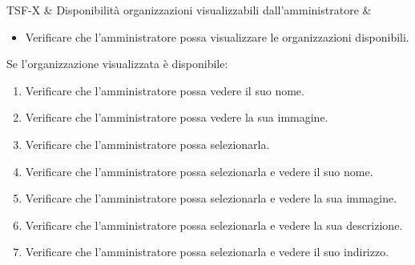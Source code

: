 TSF-X & Disponibilità organizzazioni visualizzabili dall'amministratore & \begin{itemize}
    \item Verificare che l'amministratore possa visualizzare le organizzazioni disponibili.
\end{itemize}
Se l'organizzazione visualizzata è disponibile:
\begin{enumerate}
    \item Verificare che l'amministratore possa vedere il suo nome.
    \item Verificare che l'amministratore possa vedere la sua immagine.
    \item Verificare che l'amministratore possa selezionarla.
    \item Verificare che l'amministratore possa selezionarla e vedere il suo nome.
    \item Verificare che l'amministratore possa selezionarla e vedere la sua immagine.
    \item Verificare che l'amministratore possa selezionarla e vedere la sua descrizione.
    \item Verificare che l'amministratore possa selezionarla e vedere il suo indirizzo.
\end{enumerate} \\

